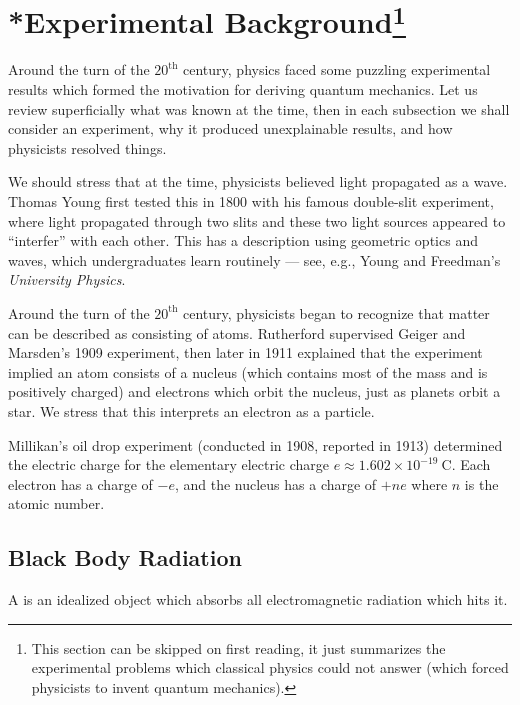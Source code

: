 \section[*Experimental Background]{*Experimental Background\footnote{This section can be skipped on first reading, it just summarizes the
experimental problems which classical physics could not answer (which
forced physicists to invent quantum mechanics).}}

\M Around the turn of the $20^{\text{th}}$ century, physics faced some
puzzling experimental results which formed the motivation for deriving
quantum mechanics. Let us review superficially what was known at the
time, then in each subsection we shall consider an experiment, why it
produced unexplainable results, and how physicists resolved things.

\label{chunk:qm:experimental-background:status-of-light}
We should stress that at the time, physicists believed light propagated
as a wave. Thomas Young first tested this in 1800 with his famous
double-slit experiment, where light propagated through two slits and
these two light sources appeared to ``interfer'' with each other. This
has a description using geometric optics and waves, which undergraduates
learn routinely --- see, e.g., Young and Freedman's
\textit{University Physics}.

\label{chunk:qm:experimental-background:atomic-theory}
Around the turn of the $20^{\text{th}}$ century, physicists began to
recognize that matter can be described as consisting of
atoms. Rutherford supervised Geiger and Marsden's 1909 experiment, then
later in 1911 explained that the experiment implied an atom consists of
a nucleus (which contains most of the mass and is positively charged)
and electrons which orbit the nucleus, just as planets orbit a star. We
stress that this interprets an electron as a particle.

Millikan's oil drop experiment (conducted in 1908, reported in 1913)
determined the electric charge for the elementary electric charge
$e\approx1.602\times10^{-19}~\mathrm{C}$.  Each electron has a charge of
$-e$, and the nucleus has a charge of $+ne$ where $n$ is the atomic
number.

\subsection{Black Body Radiation}

\begin{definition}
A  is an idealized object which absorbs all electromagnetic
radiation which hits it.
\end{definition}

